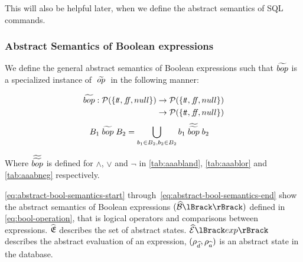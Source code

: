 This will also be helpful later, when we define the abstract semantics of SQL commands.

\subsubsection{Abstract Semantics of Boolean expressions}
We define the general abstract semantics of Boolean expressions such that $\widetilde{bop}$ is a specialized instance of $\;\widetilde{op}\;$ in the following manner:


\begin{align}
    \begin{split}
        \aab{bop} : \mathcal{P}(\{\true, \false, null\}) &\rightarrow \mathcal{P}(\{\true, \false, null\}) \\
        &\rightarrow \mathcal{P}(\{\true, \false, null\})
    \end{split}
\end{align}
\begin{align}
    B_1 \;\widetilde{bop}\; B_2 &= \bigcup_{b_1 \in B_2, b_2 \in B_2} b_1 \;\widetilde{\widetilde{bop}}\; b_2
\end{align}

Where $\widetilde{\widetilde{bop}}$ is defined for $\land$, $\lor$ and $\neg$ in \autoref{tab:aaabland}, \autoref{tab:aaablor} and \autoref{tab:aaabneg} respectively.

\autoref{eq:abstract-bool-semantics-start} through~\ref{eq:abstract-bool-semantics-end} show the abstract semantics of Boolean expressions $(\absboolsem{})$ defined in \autoref{eq:bool-operation}, that is logical operators and comparisons between expressions.
$\widehat{\mathfrak{E}}$ describes the set of abstract states. $\absexpsem{exp}$ describes the abstract evaluation of an expression, $(\rho_{\widehat{d}}, \rho_{\widehat{a}})$ is an abstract state in the database.


